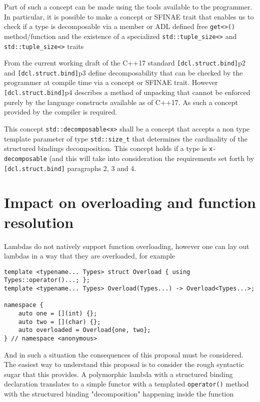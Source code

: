 \documentclass{article}
\begin{document}
Part of such a concept can be made using the tools available to the
programmer.  In particular, it is possible to make a concept or SFINAE trait
that enables us to check if a type is decomposable via a member or ADL defined
free \texttt{get<>()} method/function and the existence of a specialized
\texttt{std::tuple\_size<>} and \texttt{std::tuple\_size<>} traits

From the current working draft of the C++17 standard
\texttt{[dcl.struct.bind]}p2 and \texttt{[dcl.struct.bind]}p3 define
decomposability that can be checked by the programmer at compile time via a
concept or SFINAE trait.  However \texttt{[dcl.struct.bind]}p4 describes a
method of unpacking that cannot be enforced purely by the language constructs
available as of C++17.  As such a concept provided by the compiler is
required.

This concept \texttt{std::decomposable<x>} shall be a concept that accepts a
non type template parameter of type \texttt{std::size\_t} that determines the
cardinality of the structured bindings decomposition.  This concept holds if a
type is \texttt{x-decomposable} (and this will take into consideration the
requirements set forth by \texttt{[dcl.struct.bind]} paragraphs 2, 3 and 4.


\section{Impact on overloading and function resolution}
Lambdas do not natively support function overloading, however one can lay out
lambdas in a way that they are overloaded, for example

\begin{lstlisting}
template <typename... Types> struct Overload { using Types::operator()...; };
template <typename... Types> Overload(Types...) -> Overload<Types...>;

namespace {
    auto one = [](int) {};
    auto two = [](char) {};
    auto overloaded = Overload{one, two};
} // namespace <anonymous>
\end{lstlisting}

And in such a situation the consequences of this proposal must be considered.
The easiest way to understand this proposal is to consider the rough syntactic
sugar that this provides.  A polymorphic lambda with a structured binding
declaration translates to a simple functor with a templated
\texttt{operator()} method with the structured binding "decomposition"
happening inside the function
\end{document}
